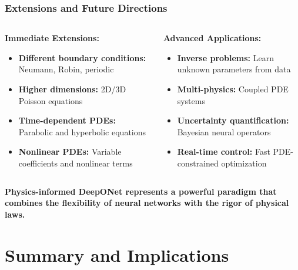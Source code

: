 \documentclass[notes]{beamer}
\begin{document}
\begin{frame}
\frametitle{Extensions and Future Directions}

\begin{columns}[T]
    \begin{column}{0.5\textwidth}
        \textbf{Immediate Extensions:}
        \begin{itemize}
            \item \textbf{Different boundary conditions:} Neumann, Robin, periodic
            \item \textbf{Higher dimensions:} 2D/3D Poisson equations
            \item \textbf{Time-dependent PDEs:} Parabolic and hyperbolic equations
            \item \textbf{Nonlinear PDEs:} Variable coefficients and nonlinear terms
        \end{itemize}
    \end{column}
    \begin{column}{0.5\textwidth}
        \textbf{Advanced Applications:}
        \begin{itemize}
            \item \textbf{Inverse problems:} Learn unknown parameters from data
            \item \textbf{Multi-physics:} Coupled PDE systems
            \item \textbf{Uncertainty quantification:} Bayesian neural operators
            \item \textbf{Real-time control:} Fast PDE-constrained optimization
        \end{itemize}
    \end{column}
\end{columns}

\vspace{1cm}

\begin{center}
\textbf{Physics-informed DeepONet represents a powerful paradigm that combines the flexibility of neural networks with the rigor of physical laws.}
\end{center}

\end{frame}

\section{Summary and Implications}
\end{document}
